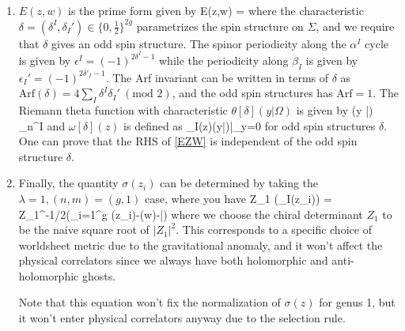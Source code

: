 \documentclass[12pt]{article}
\begin{document}
\begin{enumerate}
\item[$\bullet$] $E(z,w)$ is the prime form given by
\ie
E(z,w) = 
\label{EZW}
\fe
where the characteristic $\delta=(\delta^I, \delta_I')\in \{0,\frac{1}{2}\}^{2g}$ parametrizes the spin structure on $\Sigma$, and we require that $\delta$ gives an odd spin structure. The spinor periodicity along the $\alpha^I$ cycle is given by $\epsilon^I=(-1)^{2\delta^I-1}$ while the periodicity along $\beta_I$ is given by $\epsilon_I'=(-1)^{2\delta'_I-1}$. The Arf invariant can be written in terms of $\delta$ as $\mathrm{Arf}(\delta)=4\sum_{I}\delta^I \delta_I'\ (\text{mod }2)$, and the odd spin structures has $\text{Arf}=1$. The Riemann theta function with characteristic $\theta[\delta](y|\Omega)$ is given by 
\ie
\theta[\delta](y |\Omega) \equiv \sum_{n^I \in {}} \exp {}
\fe
and $\omega[\delta](z)$ is defined as
\ie
\omega_I(z)\theta[\delta](y|\Omega)|_{y=0}
\fe
for odd spin structures $\delta$. One can prove that the RHS of \eqref{EZW} is independent of the odd spin structure $\delta$.

\item[$\bullet$]Finally, the quantity $\sigma(z_i)$ can be determined by taking the $\lambda = 1, (n,m)=(g,1)$ case, where you have
\ie
Z_1 \det(\omega_I(z_i)) = Z_1^{-1/2}\theta\left(\sum_{i=1}^g \zeta(z_i)-\zeta(w)-\Delta|\Omega\right) 
\fe
where we choose the chiral determinant $Z_1$ to be the naive square root of $|Z_1|^2$. This corresponds to a specific choice of worldsheet metric due to the gravitational anomaly, and it won't affect the physical correlators since we always have both holomorphic and anti-holomorphic ghosts.

Note that this equation won't fix the normalization of $\sigma(z)$ for genus 1, but it won't enter physical correlators anyway due to the selection rule.

\end{enumerate}
\end{document}

